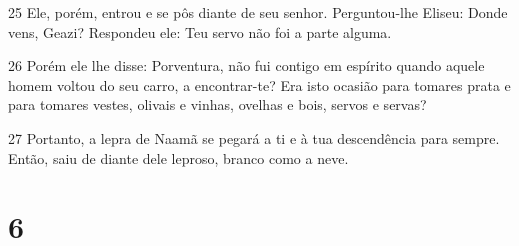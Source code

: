 \par 25 Ele, porém, entrou e se pôs diante de seu senhor. Perguntou-lhe Eliseu: Donde vens, Geazi? Respondeu ele: Teu servo não foi a parte alguma.
\par 26 Porém ele lhe disse: Porventura, não fui contigo em espírito quando aquele homem voltou do seu carro, a encontrar-te? Era isto ocasião para tomares prata e para tomares vestes, olivais e vinhas, ovelhas e bois, servos e servas?
\par 27 Portanto, a lepra de Naamã se pegará a ti e à tua descendência para sempre. Então, saiu de diante dele leproso, branco como a neve.

\chapter{6}

